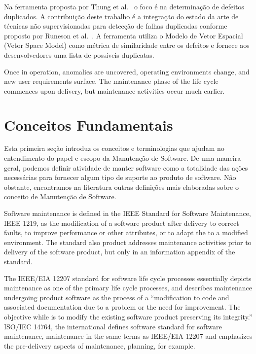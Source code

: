 Na ferramenta proposta por Thung et al.~\cite{Thung:2014:DIT:2642937.2648627} o
foco é na determinação de defeitos duplicados. A contribuição deste trabalho é a
integração do estado da arte de técnicas não supervisionadas para detecção de
falhas duplicadas conforme proposto por Runeson et al.~\cite{Runeson:2007:DDD:1248820.1248882}. A ferramenta utiliza o Modelo de Vetor Espacial (Vetor Space Model) como métrica de similaridade entre os defeitos e fornece aos desenvolvedores uma lista de possíveis duplicatas.

Once in operation, anomalies are uncovered, operating environments change, and new user requirements surface. The maintenance phase of the life cycle commences upon delivery, but maintenance activities occur much earlier.


\section{Conceitos Fundamentais}
\label{sec:conceitos_basicos}
Esta primeira seção introduz os conceitos e terminologias que ajudam no entendimento do papel e
escopo da Manutenção de Software. De uma maneira geral, podemos definir atividade de manter software
como a totalidade das ações necessárias para fornecer algum tipo de suporte ao produto de software. 
Não obstante, encontramos na literatura outras definições mais elaboradas sobre o conceito de
Manutenção de Software. 

Software maintenance is defined in the IEEE Standard for
Software Maintenance, IEEE 1219, as the modification of
a software product after delivery to correct faults, to
improve performance or other attributes, or to adapt the
to a modified environment. The standard also
product
addresses maintenance activities prior to delivery of the
software product, but only in an information appendix of
the standard.

The IEEE/EIA 12207 standard for software life cycle
processes essentially depicts maintenance as one of the
primary life cycle processes, and describes maintenance
undergoing
product
software
as the process of a
“modification to code and associated documentation due
to a problem or the need for improvement. The objective
while
is to modify the existing software product
preserving its integrity.” ISO/IEC 14764, the international
defines
software
standard for software maintenance,
maintenance in the same terms as IEEE/EIA 12207 and
emphasizes the pre-delivery aspects of maintenance,
planning, for example.

